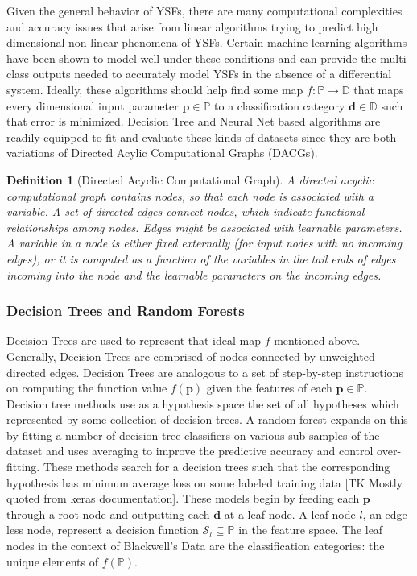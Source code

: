 \documentclass{article}
\newtheorem{definition}{Definition}[section]
\begin{document}
Given the general behavior of YSFs, there are many computational complexities and accuracy issues that arise from linear algorithms trying to predict high dimensional non-linear phenomena of YSFs.  Certain machine learning algorithms have been shown to model well under these conditions and can provide the multi-class outputs needed to accurately model YSFs in the absence of a differential system.  Ideally, these algorithms should help find some map $f: \mathbb{P} \xrightarrow{} \mathbb{D}$ that maps every dimensional input parameter $\boldsymbol{p}\in \mathbb{P}$ to a classification category $\boldsymbol{d}\in \mathbb{D}$ such that error is minimized.  Decision Tree and Neural Net based algorithms are readily equipped to fit and evaluate these kinds of datasets since they are both variations of Directed Acylic Computational Graphs (DACGs).
\begin{definition}[Directed Acyclic Computational Graph]
    A directed acyclic computational graph contains nodes, so that each node is 
    associated with a variable. A set of directed edges connect nodes, which indicate functional relationships among nodes. Edges might be associated with learnable parameters. A variable in a node is either fixed externally (for input nodes with no incoming edges), or it is computed as a function of the variables in the tail ends of edges incoming into the node and the learnable parameters on the incoming edges.
\end{definition}

\subsubsection{Decision Trees and Random Forests}

Decision Trees are used to represent that ideal map $f$ mentioned above.  Generally, Decision Trees are comprised of nodes connected by unweighted directed edges. Decision Trees are analogous to a set of step-by-step instructions on computing the function value $f(\boldsymbol{p})$ given the features of each $\boldsymbol{p}\in \mathbb{P}$. Decision tree methods use as a hypothesis space the set of all hypotheses which
represented by some collection of decision trees. A random forest expands on this by fitting a number of decision tree classifiers on various sub-samples of the dataset and uses averaging to improve the predictive accuracy and control over-fitting. These methods
search for a decision trees such that the corresponding hypothesis has minimum
average loss on some labeled training data [TK Mostly quoted from keras documentation]. These models begin by feeding each $\boldsymbol{p}$ through a root node and outputting each $\boldsymbol{d}$ at a leaf node.  A leaf node $l$, an edge-less node, represent a decision function $\mathcal{S}_l \subseteq \mathbb{P}$ in the feature space.  The leaf nodes in the context of Blackwell's Data are the classification categories: the unique elements of $f(\mathbb{P})$.
\end{document}
